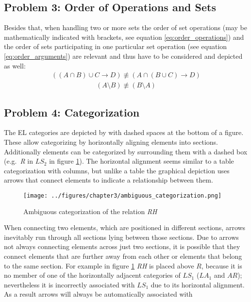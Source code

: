 \documentclass[twoside, openright, 12pt]{book}
\begin{document}
\subsection{Problem 3: Order of Operations and Sets}
Besides that, when handling two or more sets the order of set operations (may be mathematically indicated with brackets, see equation \ref{eq:order_operations}) and the order of sets participating in one particular set operation (see equation \ref{eq:order_arguments}) are relevant and thus have to be considered and depicted as well:
\begin{equation}
\begin{gathered}
((A \cap B) \cup C \rightarrow D) \not\equiv
(A \cap (B \cup C) \rightarrow D)
\end{gathered}\label{eq:order_operations}
\end{equation}
\vspace{-8mm}
\begin{equation}
\begin{gathered}
(A \setminus B) \not\equiv (B \setminus A) 
\end{gathered}\label{eq:order_arguments}
\end{equation}



\subsection{Problem 4: Categorization}
The EL categories are depicted by \cite{Amthor18} with dashed spaces at the bottom of a figure.
These allow categorizing by horizontally aligning elements into sections.
Additionally elements can be categorized by surrounding them with a dashed box (e.g.~\textit{R} in $\mathit{LS}_2$ in figure \ref{fig:ambiguous_categorization}).
The horizontal alignment seems similar to a table categorization with columns, but unlike a table the graphical depiction uses arrows that connect elements to indicate a relationship between them.

\begin{figure}[htb]
	\centering
	\texttt{[image: ../figures/chapter3/ambiguous\_categorization.png]}
	\caption{Ambiguous categorization of the relation \textit{RH}}
	\label{fig:ambiguous_categorization}
\end{figure}

\noindent
When connecting two elements, which are positioned in different sections, arrows inevitably run through all sections lying between those sections.
Due to arrows not always connecting elements across just two sections, it is possible that they connect elements that are further away from each other or elements that belong to the same section.
For example in figure \ref{fig:ambiguous_categorization} \textit{RH} is placed above $R$, because it is no member of one of the horizontally adjacent categories of $\mathit{LS}_1$ ($\mathit{LA}_1$ and $\mathit{AR}$); nevertheless it is incorrectly associated with $LS_1$ due to its horizontal alignment.
As a result arrows will always be automatically associated with
\end{document}
